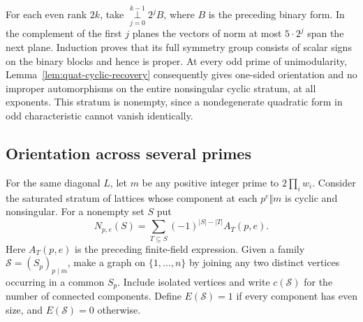 For each even rank $2k$, take $\mathop{\perp}\limits_{j=0}^{k-1}2^j B$,
where $B$ is the preceding binary form. In the complement of the first $j$ planes the vectors of norm at most $5\cdot 2^j$ span the next plane. Induction proves that its full symmetry group consists of scalar signs on the binary blocks and hence is proper. At every odd prime of unimodularity, Lemma~\ref{lem:quat-cyclic-recovery} consequently gives one-sided orientation and no improper automorphisms on the entire nonsingular cyclic stratum, at all exponents. This stratum is nonempty, since a nondegenerate quadratic form in odd characteristic cannot vanish identically.

\subsection{Orientation across several primes}
For the same diagonal $L$, let $m$ be any positive integer prime to $2\prod_i w_i$. Consider the saturated stratum of lattices whose component at each $p^e\Vert m$ is cyclic and nonsingular. For a nonempty set $S$ put
\[
 N_{p,e}(S)=\sum_{T\subseteq S}(-1)^{|S|-|T|}A_T(p,e).
\]
Here $A_T(p,e)$ is the preceding finite-field expression. Given a family $\mathcal S=(S_p)_{p\mid m}$, make a graph on $\{1,\dots,n\}$ by joining any two distinct vertices occurring in a common $S_p$. Include isolated vertices and write $c(\mathcal S)$ for the number of connected components. Define $E(\mathcal S)=1$ if every component has even size, and $E(\mathcal S)=0$ otherwise.


